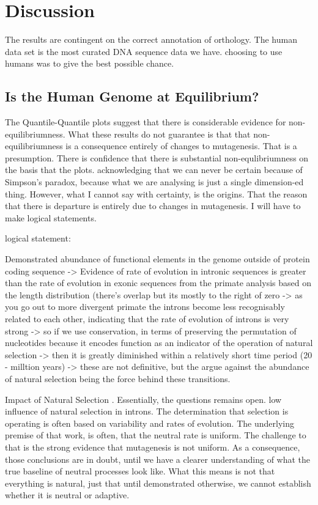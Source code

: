\chapter{Discussion}

The results are contingent on the correct annotation of orthology. The human data set is the most curated DNA sequence data we have. choosing to use humans was to give the best possible chance.




\section{Is the Human Genome at Equilibrium?}



The Quantile-Quantile plots suggest that there is considerable evidence for non-equilibriumness. What these results do not guarantee is that that non-equilibriumness is a consequence entirely of changes to mutagenesis. That is a presumption. There is confidence that there is substantial non-equlibriumness on the basis that the plots. acknowledging that we can never be certain because of Simpson's paradox, because what we are analysing is just a single dimension-ed thing. However, what I cannot say with certainty, is the origins. That the reason that there is departure is entirely due to changes in mutagenesis. I will have to make logical statements. 

logical statement: 

Demonstrated abundance of functional elements in the genome outside of protein coding sequence -> Evidence of rate of evolution in intronic sequences is greater than the rate of evolution in exonic sequences from the primate analysis based on the length distribution (there's overlap but its mostly to the right of zero -> as you go out to more divergent primate the introns become less recognisably related to each other, indicating that the rate of evolution of introns is very strong -> so if we use conservation, in terms of preserving the permutation of nucleotides because it encodes function as an indicator of the operation of natural selection -> then it is greatly diminished within a relatively short time period (20 - milltion years) -> these are not definitive, but the argue against the abundance of natural selection being the force behind these transitions.

Impact of Natural Selection \cite{Graur2013OnENCODE}. Essentially, the questions remains open. 
low influence of natural selection in introns. 
The determination that selection is operating is often based on variability and rates of evolution. The underlying premise of that work, is often, that the neutral rate is uniform. The challenge to that is the strong evidence that mutagenesis is not uniform. As a consequence, those conclusions are in doubt, until we have a clearer understanding of what the true baseline of neutral processes look like. What this means is not that everything is natural, just that until demonstrated otherwise, we cannot establish whether it is neutral or adaptive. 



